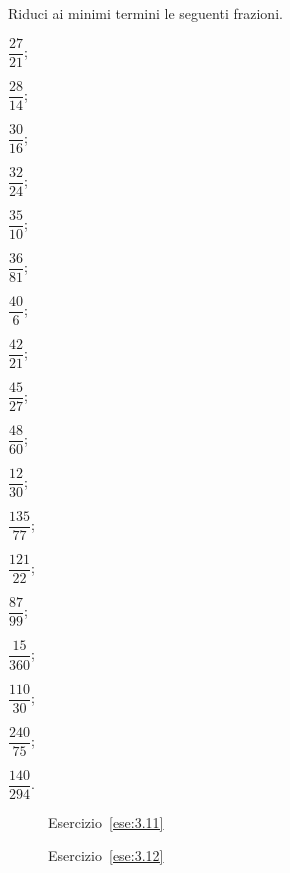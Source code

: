 \begin{esercizio}
 \label{ese:3.10}
Riduci ai minimi termini le seguenti frazioni.
 \begin{multicols}{6}
 \begin{enumeratea}
 \item $\dfrac{27}{21}$;\vspace{1.1ex}
 \item $\dfrac{28}{14}$;\vspace{1.1ex}
 \item $\dfrac{30}{16}$;
 \item $\dfrac{32}{24}$;\vspace{1.1ex}
 \item $\dfrac{35}{10}$;\vspace{1.1ex}
 \item $\dfrac{36}{81}$;
 \item $\dfrac{40}{6}$;\vspace{1.1ex}
 \item $\dfrac{42}{21}$;\vspace{1.1ex}
 \item $\dfrac{45}{27}$;
 \item $\dfrac{48}{60}$;\vspace{1.1ex}
 \item $\dfrac{12}{30}$;\vspace{1.1ex}
 \item $\dfrac{135}{77}$;
 \item $\dfrac{121}{22}$;\vspace{1.1ex}
 \item $\dfrac{87}{99}$;\vspace{1.1ex}
 \item $\dfrac{15}{360}$;
 \item $\dfrac{110}{30}$;\vspace{1.1ex}
 \item $\dfrac{240}{75}$;\vspace{1.1ex}
 \item $\dfrac{140}{294}$.
 \end{enumeratea}
 \end{multicols}
\end{esercizio}

\begin{figure}[t]
 \begin{minipage}[b]{.45\textwidth}
 \centering
 \caption{Esercizio~\ref{ese:3.11}}\label{fig:3.4}
 \end{minipage}\hfil
\begin{minipage}[b]{.45\textwidth}
 \centering
 \caption{Esercizio~\ref{ese:3.12}}\label{fig:3.5}
 \end{minipage}
\end{figure}

